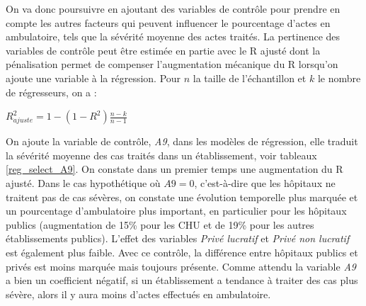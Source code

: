 On va donc poursuivre en ajoutant des variables de contrôle pour prendre en compte les autres facteurs qui peuvent influencer le pourcentage d'actes en ambulatoire, tels que la sévérité moyenne des actes traités. La pertinence des variables de contrôle peut être estimée en partie avec le R ajusté dont la pénalisation permet de compenser l'augmentation mécanique du R lorsqu'on ajoute une variable à la régression. Pour $n$ la taille de l'échantillon et $k$ le nombre de régresseurs, on a : 
     \begin{center}
         $R^2_{ajuste} = 1 - (1 - R^2)\frac{n - k}{n -1}$
     \end{center}

 On ajoute la variable de contrôle, \textit{A9}, dans les modèles de régression, elle traduit la sévérité moyenne des cas traités dans un établissement, voir tableaux \ref{reg_select_A9}. On constate dans un premier temps une augmentation du R ajusté. Dans le cas hypothétique où $A9 = 0$, c'est-à-dire que les hôpitaux ne traitent pas de cas sévères, on constate une évolution temporelle plus marquée et un pourcentage d'ambulatoire plus important, en particulier pour les hôpitaux publics (augmentation de 15\% pour les CHU et de 19\% pour les autres établissements publics). L'effet des variables \textit{Privé lucratif} et \textit{Privé non lucratif} est également plus faible. Avec ce contrôle, la différence entre hôpitaux publics et privés est moins marquée mais toujours présente. Comme attendu la variable \textit{A9} a bien un coefficient négatif, si un établissement a tendance à traiter des cas plus sévère, alors il y aura moins d'actes effectués en ambulatoire.

